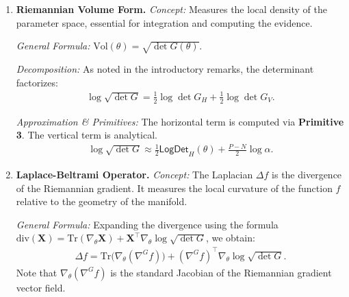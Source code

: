 \begin{enumerate}
    \emph{Decomposition:} The inverse metric acts independently on the horizontal and vertical projections of the Euclidean gradient:
    \begin{align}
        \nabla^G \mathcal{L} &= G_H^{-1} (\nabla_\theta \mathcal{L})_H + G_V^{-1} (\nabla_\theta \mathcal{L})_V.
    \end{align}
    
    \emph{Approximation \& Primitives:} 
    For the horizontal component, we solve the linear system using \textbf{Primitive 2} (interpreting the gradient as a pullback $\mathbf{J}^\top \mathbf{g}_\eta$). For the vertical component, we simply scale by $1/\alpha$.
    \begin{align}
        (\nabla^G \mathcal{L})_H &\approx \textsf{LstSq}\big(\theta, \, \mathbf{W}^{-1/2} \nabla_\eta \mathcal{L}\big) \\
        (\nabla^G \mathcal{L})_V &= \frac{1}{\alpha} \textsf{Proj}_V\big(\theta, \, \nabla_\theta \mathcal{L}\big).
    \end{align}

    \item \textbf{Riemannian Volume Form.}
    \emph{Concept:} Measures the local density of the parameter space, essential for integration and computing the evidence.
    
    \emph{General Formula:} $\text{Vol}(\theta) = \sqrt{\det G(\theta)}$.
    
    \emph{Decomposition:} As noted in the introductory remarks, the determinant factorizes:
    \begin{align}
        \log \sqrt{\det G} = \frac{1}{2} \log \det G_H + \frac{1}{2} \log \det G_V.
    \end{align}
    
    \emph{Approximation \& Primitives:} The horizontal term is computed via \textbf{Primitive 3}. The vertical term is analytical.
    \begin{align}
        \log \sqrt{\det G} \approx \frac{1}{2} \textsf{LogDet}_H(\theta) + \frac{P-N}{2} \log \alpha.
    \end{align}

    \item \textbf{Laplace-Beltrami Operator.}
    \emph{Concept:} 
    The Laplacian $\Delta f$ is the divergence of the Riemannian gradient. It measures the local curvature of the function $f$ relative to the geometry of the manifold.
    
    \emph{General Formula:} 
    Expanding the divergence using the formula $\text{div}(\mathbf{X}) = \text{Tr}(\nabla_\theta \mathbf{X}) + \mathbf{X}^\top \nabla_\theta \log \sqrt{\det G}$, we obtain:
    \begin{align}
        \Delta f = \text{Tr}\big( \nabla_\theta (\nabla^G f) \big) + (\nabla^G f)^\top \nabla_\theta \log \sqrt{\det G}.
    \end{align}
    Note that $\nabla_\theta (\nabla^G f)$ is the standard Jacobian of the Riemannian gradient vector field.
    

\end{enumerate}
